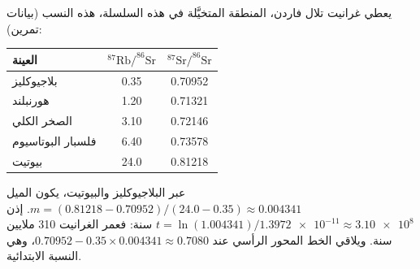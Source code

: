 \begin{example}\label{ex:g12:age-of-the-earth:varden}
يعطي غرانيت تلال فاردن، المنطقة المتخيَّلة في هذه السلسلة، هذه
النسب (بيانات تمرين):
\begin{center}
\small
\begin{tabular}{|l|c|c|}
\hline
العينة & $^{87}\mathrm{Rb}/^{86}\mathrm{Sr}$ & $^{87}\mathrm{Sr}/^{86}\mathrm{Sr}$ \\
\hline
بلاجيوكليز & 0.35 & 0.70952 \\
هورنبلند  & 1.20 & 0.71321 \\
الصخر الكلي  & 3.10 & 0.72146 \\
فلسبار البوتاسيوم  & 6.40 & 0.73578 \\
بيوتيت     & 24.0 & 0.81218 \\
\hline
\end{tabular}
\end{center}
عبر البلاجيوكليز والبيوتيت، يكون الميل
$m = (0.81218 - 0.70952)/(24.0 - 0.35) \approx 0.004341$. إذن
$t = \ln(1.004341)/\num{1.3972e-11} \approx \num{3.10e8}$ سنة:
فعمر الغرانيت 310 ملايين سنة. ويلاقي الخط المحور الرأسي عند
$0.70952 - 0.35 \times 0.004341 \approx 0.7080$، وهي النسبة الابتدائية.
\end{example}

